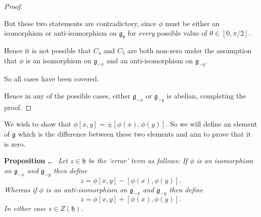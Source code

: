 \documentclass[honours]{UNSWthesis}
\newcommand{\g}{\mathfrak{g}}
\newcommand{\1}{\mathbf{e}_{1}}
\newcommand{\2}{\mathbf{e}_{3}}
\newcommand{\3}{\mathbf{e}_{3}}
\newcounter{Item}[section]
\newenvironment{Proposition}{\medskip
                            \refstepcounter{Item}
                            \noindent
                           {\bf Proposition \thesection.\theItem.}\ %
                            \begingroup \sl}
                           {\endgroup\medskip}
\begin{document}
\begin{proof}
\begin{enumerate}
But these two statements are contradictory, since $\phi$ must be either an isomorphism or anti-isomorphism on $\g_{\theta}$ for \emph{every} possible value of $\theta \in [0, \pi/2]$.

Hence it is not possible that $C_4$ and $C_5$ are both non-zero under the assumption that $\phi$ is an isomorphism on $\g_{-x}$ and an anti-isomorphism on $\g_{-y}$. 

So all cases have been covered.

\end{enumerate}
Hence in any of the possible cases, either $\g_{-x}$ or $\g_{-y}$ is abelian, completing the proof. 

\end{proof}

We wish to show that $\phi[x,y]= \pm[\phi(x),\phi(y)]$. So we will define an element of $\g$ which is the difference between these two elements and aim to prove that it is zero.

\begin{Proposition}
 Let $z \in \mathfrak{h}$ be the `error' term as follows: If $\phi$ is an isomorphism on $\g_{-x}$ and $\g_{-y}$ then define
\[
z = \phi [x,y] -[\phi(x),\phi(y)].
\]
Whereas if $\phi$ is an anti-isomorphism on $\g_{-x}$ and $\g_{-y}$ then define
\[
z = \phi [x,y] +[\phi(x),\phi(y)].
\]
In either case $z \in Z(\mathfrak{h})$.
\end{Proposition}
\end{document}
